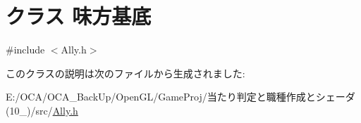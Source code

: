 \hypertarget{class_xE5_x91_xB3_xE6_x96_xB9_xE5_x9F_xBA_xE5_xBA_x95}{\section{クラス 味方基底}
\label{class_xE5_x91_xB3_xE6_x96_xB9_xE5_x9F_xBA_xE5_xBA_x95}
}


{\ttfamily \#include $<$Ally.\-h$>$}



このクラスの説明は次のファイルから生成されました\-:\begin{DoxyCompactItemize}
\item 
E\-:/\-O\-C\-A/\-O\-C\-A\-\_\-\-Back\-Up/\-Open\-G\-L/\-Game\-Proj/当たり判定と職種作成とシェーダ(10\-\_)/src/\hyperlink{_ally_8h}{Ally.\-h}\end{DoxyCompactItemize}
